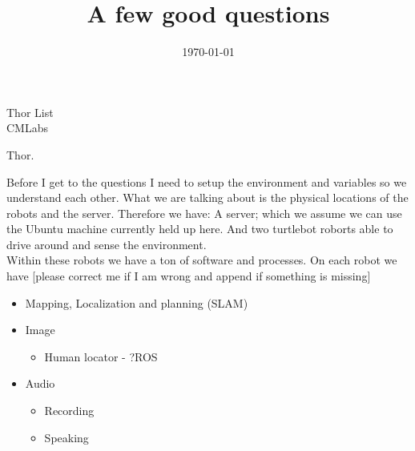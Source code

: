 \documentclass[a4, 12pt]{letter}
\title{A few good questions}
\date{\vfill \today }
\begin{document}
\begin{letter}{Thor List \\ CMLabs \\ }

\opening{Thor.}
Before I get to the questions I need to setup the environment and variables so we understand each other. What we are talking about is the physical locations of the robots and the server. Therefore we have: A server; which we assume we can use the Ubuntu machine currently held up here. And two turtlebot roborts able to drive around and sense the environment. \\
Within these robots we have a ton of software and processes. On each robot we have [please correct me if I am wrong and append if something is missing]
\begin{itemize}
	\item Mapping, Localization and planning (SLAM)
	\item Image
	\begin{itemize}
		\item Human locator - ?ROS
	\end{itemize}
	\item Audio
	\begin{itemize}
		\item Recording 
		\item Speaking
	\end{itemize}
\end{itemize}


\end{letter}
\end{document}
